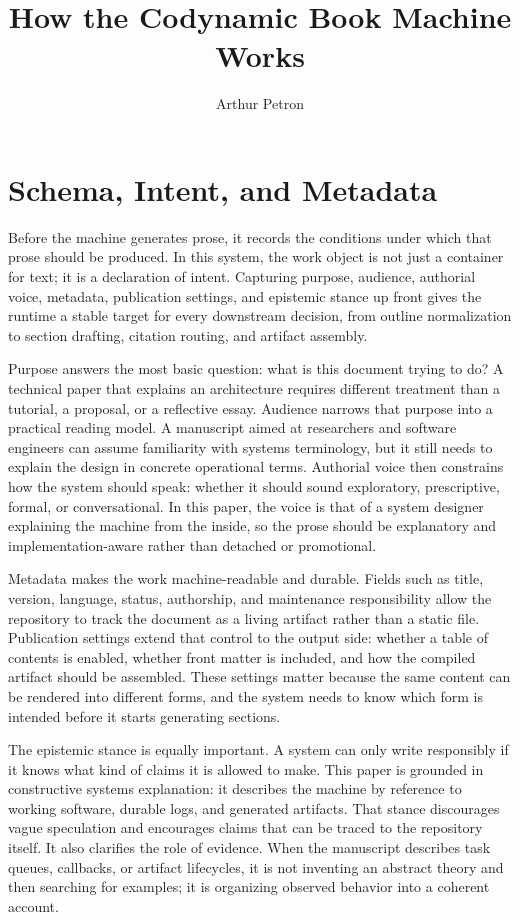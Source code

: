 \documentclass[11pt]{article}
\title{How the Codynamic Book Machine Works}
\author{Arthur Petron}
\begin{document}
\section*{Schema, Intent, and Metadata}

Before the machine generates prose, it records the conditions under which that prose should be produced. In this system, the work object is not just a container for text; it is a declaration of intent. Capturing purpose, audience, authorial voice, metadata, publication settings, and epistemic stance up front gives the runtime a stable target for every downstream decision, from outline normalization to section drafting, citation routing, and artifact assembly.

Purpose answers the most basic question: what is this document trying to do? A technical paper that explains an architecture requires different treatment than a tutorial, a proposal, or a reflective essay. Audience narrows that purpose into a practical reading model. A manuscript aimed at researchers and software engineers can assume familiarity with systems terminology, but it still needs to explain the design in concrete operational terms. Authorial voice then constrains how the system should speak: whether it should sound exploratory, prescriptive, formal, or conversational. In this paper, the voice is that of a system designer explaining the machine from the inside, so the prose should be explanatory and implementation-aware rather than detached or promotional.

Metadata makes the work machine-readable and durable. Fields such as title, version, language, status, authorship, and maintenance responsibility allow the repository to track the document as a living artifact rather than a static file. Publication settings extend that control to the output side: whether a table of contents is enabled, whether front matter is included, and how the compiled artifact should be assembled. These settings matter because the same content can be rendered into different forms, and the system needs to know which form is intended before it starts generating sections.

The epistemic stance is equally important. A system can only write responsibly if it knows what kind of claims it is allowed to make. This paper is grounded in constructive systems explanation: it describes the machine by reference to working software, durable logs, and generated artifacts. That stance discourages vague speculation and encourages claims that can be traced to the repository itself. It also clarifies the role of evidence. When the manuscript describes task queues, callbacks, or artifact lifecycles, it is not inventing an abstract theory and then searching for examples; it is organizing observed behavior into a coherent account.
\end{document}
